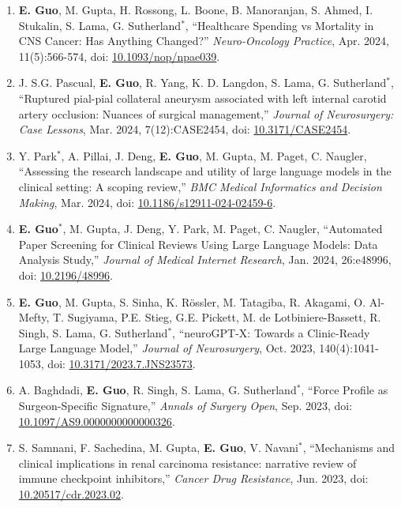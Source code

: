 \documentclass{article}
\begin{document}
\begin{enumerate}
    \item \textbf{E. Guo}, M. Gupta, H. Rossong, L. Boone, B. Manoranjan, S. Ahmed, I. Stukalin, S. Lama, G. Sutherland$^*$, ``Healthcare Spending vs Mortality in CNS Cancer: Has Anything Changed?'' \textit{Neuro-Oncology Practice}, Apr. 2024, 11(5):566-574, doi: \href{https://doi.org/10.1093/nop/npae039}{10.1093/nop/npae039}.
    \item J. S.G. Pascual, \textbf{E. Guo}, R. Yang, K. D. Langdon, S. Lama, G. Sutherland$^*$, ``Ruptured pial-pial collateral aneurysm associated with left internal carotid artery occlusion: Nuances of surgical management,'' \textit{Journal of Neurosurgery: Case Lessons}, Mar. 2024, 7(12):CASE2454, doi: \href{https://doi.org/10.3171/CASE2454}{10.3171/CASE2454}.
    \item Y. Park$^*$, A. Pillai, J. Deng, \textbf{E. Guo}, M. Gupta, M. Paget, C. Naugler, ``Assessing the research landscape and utility of large language models in the clinical setting: A scoping review,'' \textit{BMC Medical Informatics and Decision Making}, Mar. 2024, doi: \href{https://doi.org/10.1186/s12911-024-02459-6}{10.1186/s12911-024-02459-6}.
    \item \textbf{E. Guo}$^*$, M. Gupta, J. Deng, Y. Park, M. Paget, C. Naugler, ``Automated Paper Screening for Clinical Reviews Using Large Language Models: Data Analysis Study,'' \textit{Journal of Medical Internet Research}, Jan. 2024, 26:e48996, doi: \href{https://doi.org/10.2196/48996}{10.2196/48996}.
    \item \textbf{E. Guo}, M. Gupta, S. Sinha, K. R\"ossler, M. Tatagiba, R. Akagami, O. Al-Mefty, T. Sugiyama, P.E. Stieg, G.E. Pickett, M. de Lotbiniere-Bassett, R. Singh, S. Lama, G. Sutherland$^*$, ``neuroGPT-X: Towards a Clinic-Ready Large Language Model,'' \textit{Journal of Neurosurgery}, Oct. 2023, 140(4):1041-1053, doi: \href{https://doi.org/10.3171/2023.7.JNS23573}{10.3171/2023.7.JNS23573}.
    \item A. Baghdadi, \textbf{E. Guo}, R. Singh, S. Lama, G. Sutherland$^*$, ``Force Profile as Surgeon-Specific Signature,'' \textit{Annals of Surgery Open}, Sep. 2023, doi: \href{https://doi.org/10.1097/AS9.0000000000000326}{10.1097/AS9.0000000000000326}.
    \item S. Samnani, F. Sachedina, M. Gupta, \textbf{E. Guo}, V. Navani$^*$, ``Mechanisms and clinical implications in renal carcinoma resistance: narrative review of immune checkpoint inhibitors,'' \textit{Cancer Drug Resistance}, Jun. 2023, doi: \href{https://doi.org/10.20517/cdr.2023.02 }{10.20517/cdr.2023.02}.

\end{enumerate}
\end{document}
